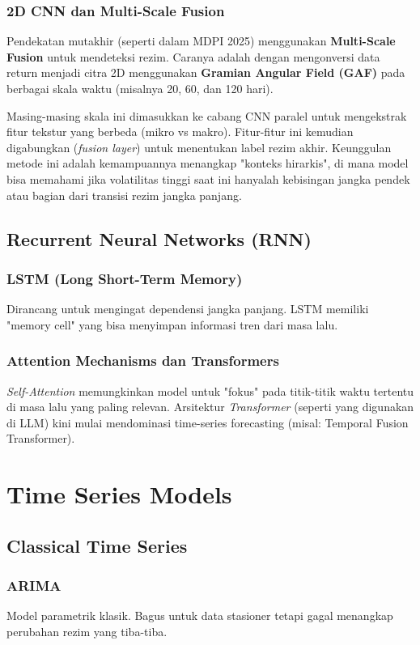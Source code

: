 \documentclass[12pt,a4paper]{book}
\begin{document}
\subsection{2D CNN dan Multi-Scale Fusion}
Pendekatan mutakhir (seperti dalam MDPI 2025) menggunakan \textbf{Multi-Scale Fusion} untuk mendeteksi rezim. Caranya adalah dengan mengonversi data return menjadi citra 2D menggunakan \textbf{Gramian Angular Field (GAF)} pada berbagai skala waktu (misalnya 20, 60, dan 120 hari). 

Masing-masing skala ini dimasukkan ke cabang CNN paralel untuk mengekstrak fitur tekstur yang berbeda (mikro vs makro). Fitur-fitur ini kemudian digabungkan (\textit{fusion layer}) untuk menentukan label rezim akhir. Keunggulan metode ini adalah kemampuannya menangkap "konteks hirarkis", di mana model bisa memahami jika volatilitas tinggi saat ini hanyalah kebisingan jangka pendek atau bagian dari transisi rezim jangka panjang.

\section{Recurrent Neural Networks (RNN)}
\subsection{LSTM (Long Short-Term Memory)}
Dirancang untuk mengingat dependensi jangka panjang. LSTM memiliki "memory cell" yang bisa menyimpan informasi tren dari masa lalu.

\subsection{Attention Mechanisms dan Transformers}
\textit{Self-Attention} memungkinkan model untuk "fokus" pada titik-titik waktu tertentu di masa lalu yang paling relevan. Arsitektur \textit{Transformer} (seperti yang digunakan di LLM) kini mulai mendominasi time-series forecasting (misal: Temporal Fusion Transformer).

\chapter{Time Series Models}
\section{Classical Time Series}
\subsection{ARIMA}
Model parametrik klasik. Bagus untuk data stasioner tetapi gagal menangkap perubahan rezim yang tiba-tiba.
\end{document}

